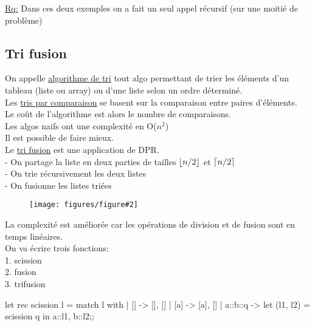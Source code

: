 \documentclass{article}
\DeclarePairedDelimiter\ceil{\lceil}{\rceil}
\DeclarePairedDelimiter\floor{\lfloor}{\rfloor}
\newcommand{\schem}[3]
{
	\begin{figure}[ht]
		\centering
		\textbf{#1}\par\medskip
		\texttt{[image: figures/figure\#2]}
		\caption{}
	\end{figure}
}
\begin{document}
				\underline{Rq:} Dans ces deux exemples on a fait un seul appel récursif (sur une moitié de problème)
				
			\subsection{Tri fusion}
			
				On appelle \underline{algorithme de tri} tout algo permettant de trier les éléments d'un tableau (liste ou array) ou d'une liste selon un ordre déterminé.\\
				Les \underline{tris par comparaison} se basent sur la comparaison entre paires d'éléments.\\
				Le coût de l'algorithme est alors le nombre de comparaisons.\\
				Les algos naifs ont une complexité en O($n^2$)\\
				Il est possible de faire mieux.\\
				Le \underline{tri fusion} est une application de DPR.\\
				- On partage la liste en deux parties de tailles $\floor*{n / 2}$ et $\ceil*{n / 2}$\\
				- On trie récursivement les deux listes\\
				- On fusionne les listes triées\\
				
				\schem{}{4}{0.5}
				
				\iffalse
				\begin{figure}[h!]
					$$\xymatrix {
					&&&*+[F]+{L} \ar[ld]^-*+{u} \ar[rd] \\
					
					&&*+[F]+{L1} \ar[d] &&*+[F]+{L2} \ar[d] \\
					(tri fusion)
					&&*+[F]+{L1'} &&*+[F]+{L2'} && } $$ (triée)
					(fusion)
					&&&*+[F]+{L'} \ar[ld] \ar[rd] \\(trié)$$
				\end{figure}
				\fi
				
				La complexité est améliorée car les opérations de division et de fusion sont en temps linéaires.\\
				On va écrire trois fonctions:\\
				1. scission\\
				2. fusion\\
				3. trifusion
				
				\begin{case}
let rec scission l = match l with
| [] -> [], []
| [a] -> [a], []
| a::b::q -> let (l1, l2) = scission q in a::l1, b::l2;;
				\end{case}
				
\end{document}
